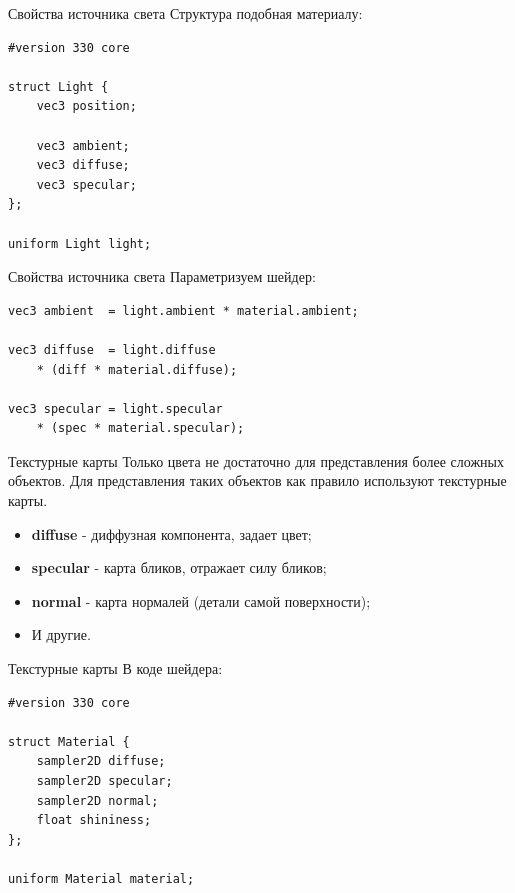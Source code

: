 \documentclass[aspectration=1610,t]{beamer}
\begin{document}
\begin{frame}[fragile]{Свойства источника света}
    Структура подобная материалу:
    {\small \begin{lstlisting}
#version 330 core

struct Light {
    vec3 position;

    vec3 ambient;
    vec3 diffuse;
    vec3 specular;
};

uniform Light light;
    \end{lstlisting}}
\end{frame}

\begin{frame}[fragile]{Свойства источника света}
    Параметризуем шейдер:
    {\small \begin{lstlisting}
vec3 ambient  = light.ambient * material.ambient;

vec3 diffuse  = light.diffuse 
    * (diff * material.diffuse);

vec3 specular = light.specular
    * (spec * material.specular); 
    \end{lstlisting}}
\end{frame}

\begin{frame}[fragile]{Текстурные карты}
    Только цвета не достаточно для представления более сложных объектов.
    Для представления таких объектов как правило используют текстурные карты.
    \begin{itemize}
        \item {\bf diffuse} - диффузная компонента, задает цвет;
        \item {\bf specular} - карта бликов, отражает силу бликов;
        \item {\bf normal} - карта нормалей (детали самой поверхности);
        \item И другие.
    \end{itemize}
\end{frame}

\begin{frame}[fragile]{Текстурные карты}
    В коде шейдера:
    {\small \begin{lstlisting}
#version 330 core

struct Material {
    sampler2D diffuse;
    sampler2D specular;
    sampler2D normal;
    float shininess;
}; 
    
uniform Material material;
    \end{lstlisting}}
\end{frame}
\end{document}
